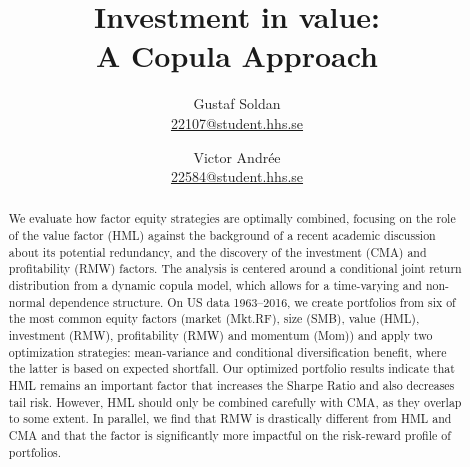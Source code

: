 
\begin{titlepage}
  \title{Investment in value:\\A Copula Approach}
  \author{
    Gustaf Soldan \\ \href{mailto:22107@student.hhs.se}{22107@student.hhs.se}\and
    Victor Andrée \\ \href{mailto:22584@student.hhs.se}{22584@student.hhs.se}
  }

  \maketitle

  \begin{abstract}
    \noindent We evaluate how factor equity strategies are optimally combined, focusing on the role of the value factor (HML) against the background of a recent academic discussion about its potential redundancy, and the discovery of the investment (CMA) and profitability (RMW) factors. The analysis is centered around a conditional joint return distribution from a dynamic copula model, which allows for a time-varying and non-normal dependence structure. On US data 1963--2016, we create portfolios from six of the most common equity factors (market (Mkt.RF), size (SMB), value (HML), investment (RMW), profitability (RMW) and momentum (Mom)) and apply two optimization strategies: mean-variance and conditional diversification benefit, where the latter is based on expected shortfall. Our optimized portfolio results indicate that HML remains an important factor that increases the Sharpe Ratio and also decreases tail risk. However, HML should only be combined carefully with CMA, as they overlap to some extent. In parallel, we find that RMW is drastically different from HML and CMA and that the factor is significantly more impactful on the risk-reward profile of portfolios.
  \end{abstract}

  \thispagestyle{empty}
\end{titlepage}
